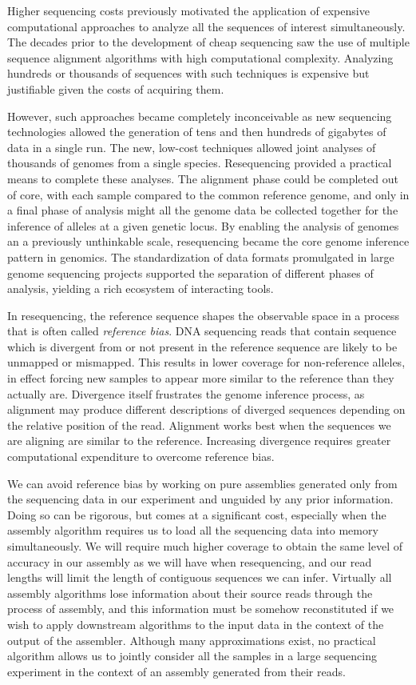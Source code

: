 Higher sequencing costs previously motivated the application of expensive computational approaches to analyze all the sequences of interest simultaneously.
The decades prior to the development of cheap sequencing saw the use of multiple sequence alignment algorithms with high computational complexity.
Analyzing hundreds or thousands of sequences with such techniques is expensive but justifiable given the costs of acquiring them.

However, such approaches became completely inconceivable as new sequencing technologies allowed the generation of tens and then hundreds of gigabytes of data in a single run.
The new, low-cost techniques allowed joint analyses of thousands of genomes from a single species.
Resequencing provided a practical means to complete these analyses.
The alignment phase could be completed out of core, with each sample compared to the common reference genome, and only in a final phase of analysis might all the genome data be collected together for the inference of alleles at a given genetic locus.
By enabling the analysis of genomes an a previously unthinkable scale, resequencing became the core genome inference pattern in genomics.
The standardization of data formats promulgated in large genome sequencing projects supported the separation of different phases of analysis, yielding a rich ecosystem of interacting tools.

In resequencing, the reference sequence shapes the observable space in a process that is often called \emph{reference bias}.
DNA sequencing reads that contain sequence which is divergent from or not present in the reference sequence are likely to be unmapped or mismapped.
This results in lower coverage for non-reference alleles, in effect forcing new samples to appear more similar to the reference than they actually are.
Divergence itself frustrates the genome inference process, as alignment may produce different descriptions of diverged sequences depending on the relative position of the read.
Alignment works best when the sequences we are aligning are similar to the reference.
Increasing divergence requires greater computational expenditure to overcome reference bias.

We can avoid reference bias by working on pure assemblies generated only from the sequencing data in our experiment and unguided by any prior information.
Doing so can be rigorous, but comes at a significant cost, especially when the assembly algorithm requires us to load all the sequencing data into memory simultaneously.
We will require much higher coverage to obtain the same level of accuracy in our assembly as we will have when resequencing, and our read lengths will limit the length of contiguous sequences we can infer.
Virtually all assembly algorithms lose information about their source reads through the process of assembly, and this information must be somehow reconstituted if we wish to apply downstream algorithms to the input data in the context of the output of the assembler.
Although many approximations exist, no practical algorithm allows us to jointly consider all the samples in a large sequencing experiment in the context of an assembly generated from their reads.

